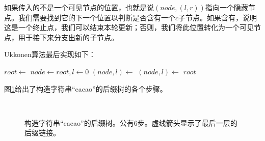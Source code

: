 \documentclass[UTF8]{article}
\begin{document}
如果传入的不是一个可见节点的位置，也就是说$(node, (l, r))$指向一个隐藏节点。我们需要找到它的下一个位置以判断是否含有一个$c$子节点。如果含有，说明这是一个终止点，我们可以结束本轮更新；否则，我们将此位置转化为一个可见节点，用于接下来分支出新的子节点。

Ukkonen算法最后实现如下：

\begin{algorithmic}[1]
  \State $root \gets$ 
  \State $node \gets root, l \gets 0$
    \State $(node, l) \gets $ 
    \State $(node, l) \gets $ 
  \EndFor
  \State \Return $root$
\EndFunction
\end{algorithmic}

图\ref{fig:cons-stree-cacao}给出了构造字符串“cacao”的后缀树的各个步骤。

\begin{figure}[htbp]
  \centering
   \\
  \caption{构造字符串“cacao”的后缀树。公有6步。虚线箭头显示了最后一层的后缀链接。}
  \label{fig:cons-stree-cacao}
\end{figure}
\end{document}
